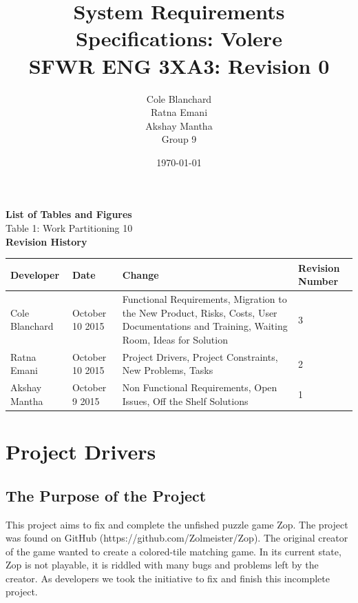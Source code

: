 \documentclass[12pt]{article}
\begin{document}
\title{System Requirements Specifications: Volere\\SFWR ENG 3XA3: Revision 0}
\author{Cole Blanchard\\Ratna Emani\\Akshay Mantha\\Group 9}
\date{\today}
\maketitle
\pagebreak

\tableofcontents
\textbf{List of Tables and Figures}\\
Table 1: Work Partitioning \hfill \hfill 10\\

\newpage
\textbf{Revision History}\\
\begin{center}
 \begin{tabular}{|C{3cm}|C{3cm}|C{3cm}|C{3cm}|}
 \hline
 \textbf{Developer} & \textbf{Date} & \textbf{Change} & \textbf{Revision Number}\\
 \hline \hline
 Cole Blanchard & October 10 2015 & Functional Requirements, Migration to the New Product, Risks, Costs, User Documentations and Training, Waiting Room, Ideas for Solution & 3\\
 \hline
 Ratna Emani & October 10 2015 & Project Drivers, Project Constraints, New Problems, Tasks & 2\\
 \hline
 Akshay Mantha & October 9 2015 & Non Functional Requirements, Open Issues, Off the Shelf Solutions & 1\\
 \hline
 \end{tabular}
\end{center}

\pagebreak

\section{Project Drivers}
\subsection{The Purpose of the Project}
This project aims to fix and complete the unfished puzzle game Zop. The project was found on GitHub (https://github.com/Zolmeister/Zop). The original creator of the game wanted to create a colored-tile matching game. In its current state, Zop is not playable, it is riddled with many bugs and problems left by the creator. As developers we took the initiative to fix and finish this incomplete project.
\end{document}
